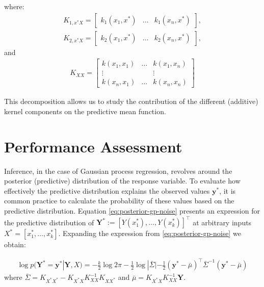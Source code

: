where:
\begin{gather*}
    K_{1, x^{\ast}X} =
    \begin{bmatrix}
        k_1(x_1, x^{\ast}) & \dots & k_1(x_n,  x^{\ast})
    \end{bmatrix}, \\
    K_{2, x^{\ast}X} =
    \begin{bmatrix}
        k_2(x_1, x^{\ast}) & \dots & k_2(x_n,  x^{\ast})
    \end{bmatrix},
\end{gather*}
and
\begin{gather*}
        K_{XX} =
    \begin{bmatrix}
        k(x_1, x_1) & \dots & k(x_1, x_n)\\
        \vdots  &  & \vdots \\
        k(x_n, x_1) & \dots  & k(x_n, x_n)
    \end{bmatrix}
\end{gather*}

This decomposition allows us to study
the contribution of the different (additive) kernel components on the predictive mean function.



\section{Performance Assessment}\label{sec:performance-assessment}
Inference, in the case of Gaussian process regression, revolves around the posterior (predictive) distribution
of the response variable.
To evaluate how effectively the predictive distribution explains the observed values
$\mathbf{y^{\ast}}$,
it is common practice to calculate the probability of these values based on the predictive distribution.
Equation \ref{eq:posterior-gp-noise} presents an expression for the predictive distribution of
$\mathbf{Y^{\ast}}:= [Y(x_1^{\ast}), \dots, Y(x_k^{\ast})]^{\top}$ at arbitrary inputs
$X^{\ast} = [x_1^{\ast}, \dots, x_k^{\ast}]$.
Expanding the expression from \ref{eq:posterior-gp-noise} we obtain:

\begin{gather}\label{eq:predictive-dist}
    \log p(\mathbf{Y^{\ast}} = \mathbf{y^{\ast}}| \mathbf{Y}, X) =
    -\frac{k}{2} \log 2 \pi - \frac{1}{2} \log|\bar{\Sigma}| -
        \frac{1}{2}(\mathbf{y^{\ast}} - \bar{\mu})^{\top} \bar{\Sigma}^{-1} (\mathbf{y^{\ast}} - \bar{\mu})
\end{gather}
where
$\bar{\Sigma} = K_{X^{\ast}X^{\ast}} - K_{X^{\ast}X} K_{XX}^{-1} K_{XX^{\ast}}$
and $\bar{\mu} = K_{X^{\ast}X} K_{XX}^{-1} \mathbf{Y}$.


